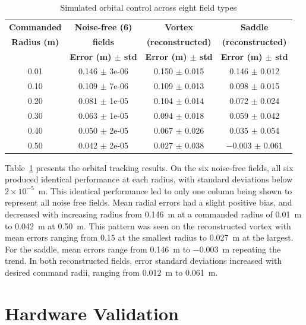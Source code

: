 \documentclass[lettersize,journal]{IEEEtran}
\begin{document}
\begin{table}[!t]
    \centering
    \caption{Simulated orbital control across eight field types}
    \label{tab:simulation_orbital_results}
    \footnotesize
    \setlength{\tabcolsep}{3pt}
    \begin{tabular}{cccc}
    \hline
    \textbf{Commanded} & \textbf{Noise-free (6)} & \textbf{Vortex} & \textbf{Saddle} \\
    \textbf{Radius (m)} & \textbf{fields} & \textbf{(reconstructed)} & \textbf{(reconstructed)} \\
     & \textbf{Error (m) $\pm$ std} & \textbf{Error (m) $\pm$ std} & \textbf{Error (m) $\pm$ std} \\
    \hline
    0.01 & 0.146 $\pm$ 3e-06 & 0.150 $\pm$ 0.015 & 0.146 $\pm$ 0.012 \\
    0.10 & 0.109 $\pm$ 7e-06 & 0.109 $\pm$ 0.013 & 0.098 $\pm$ 0.015 \\
    0.20 & 0.081 $\pm$ 1e-05 & 0.104 $\pm$ 0.014 & 0.072 $\pm$ 0.024 \\
    0.30 & 0.063 $\pm$ 1e-05 & 0.094 $\pm$ 0.018 & 0.059 $\pm$ 0.042 \\
    0.40 & 0.050 $\pm$ 2e-05 & 0.067 $\pm$ 0.026 & 0.035 $\pm$ 0.054 \\
    0.50 & 0.042 $\pm$ 2e-05 & 0.027 $\pm$ 0.038 & $-$0.003 $\pm$ 0.061 \\

    \hline
    \end{tabular}
    \end{table}


    Table~\ref{tab:simulation_orbital_results} presents the orbital tracking results. On the six noise-free fields, all six produced identical
    performance at each radius, with standard deviations below $2 \times 10^{-5}$~m. This identical performance led to only one column being shown to represent all noise free fields. Mean radial errors had a slight positive bias, and decreased with increasing radius from 0.146~m at a commanded radius of 0.01~m to 0.042~m at 0.50~m. This pattern was seen on the reconstructed vortex with mean errors ranging from 0.15 at the smallest radius to 0.027~m at the largest. For the saddle, mean errors range from 0.146~m to $-0.003$~m repeating the trend. In both reconstructed fields, error standard deviations increased with desired command radii, ranging from 0.012~m to 0.061~m.    


\section{Hardware Validation}
\end{document}
